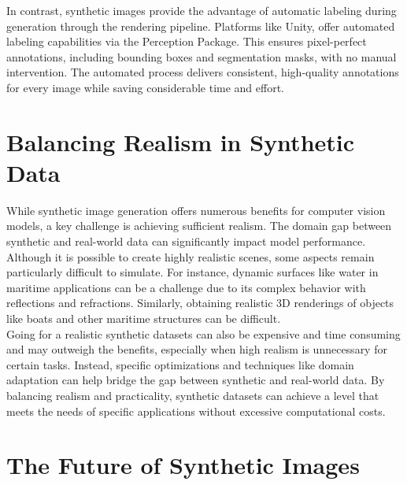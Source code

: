 \noindent In contrast, synthetic images provide the advantage of automatic labeling during generation through the rendering pipeline. Platforms like Unity, offer automated labeling capabilities via the Perception Package. \cite{unity-perception2022} This ensures pixel-perfect annotations, including bounding boxes and segmentation masks, with no manual intervention. The automated process delivers consistent, high-quality annotations for every image while saving considerable time and effort.


\section{Balancing Realism in Synthetic Data}
While synthetic image generation offers numerous benefits for computer vision models, a key challenge is achieving sufficient realism. The domain gap between synthetic and real-world data can significantly impact model performance.\cite{nikolenko2021synthetic}  Although it is possible to create highly realistic scenes, some aspects remain particularly difficult to simulate. For instance, dynamic surfaces like water in maritime applications can be a challenge due to its complex behavior with reflections and refractions. \cite{waterrendering} Similarly, obtaining realistic 3D renderings of objects like boats and other maritime structures can be difficult.\\

\noindent Going for a realistic synthetic datasets can also be expensive and time consuming and may outweigh the benefits, especially when high realism is unnecessary for certain tasks. Instead, specific optimizations and techniques like domain adaptation can help bridge the gap between synthetic and real-world data. \cite{nikolenko2021synthetic, jimaging8110310} By balancing realism and practicality, synthetic datasets can achieve a level that meets the needs of specific applications without excessive computational costs.


\section{The Future of Synthetic Images}

